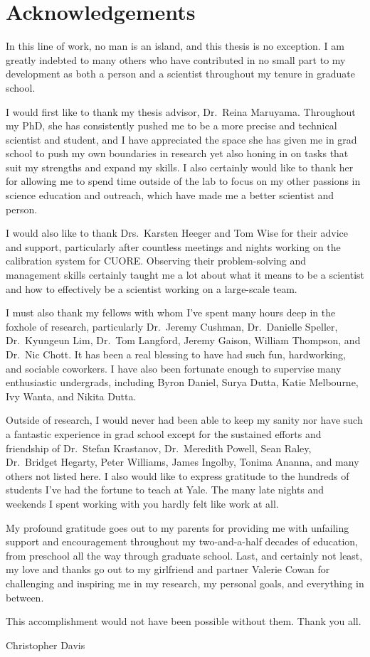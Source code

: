 \chapter*{Acknowledgements}
In this line of work, no man is an island, and this thesis is no exception.
I am greatly indebted to many others who have contributed in no small part to my development as both a person and a scientist throughout my tenure in graduate school.

I would first like to thank my thesis advisor, Dr.\ Reina Maruyama.
Throughout my PhD, she has consistently pushed me to be a more precise and technical scientist and student, and I have appreciated the space she has given me in grad school to push my own boundaries in research yet also honing in on tasks that suit my strengths and expand my skills.
I also certainly would like to thank her for allowing me to spend time outside of the lab to focus on my other passions in science education and outreach, which have made me a better scientist and person.

I would also like to thank Drs.\ Karsten Heeger and Tom Wise for their advice and support, particularly after countless meetings and nights working on the calibration system for CUORE.
Observing their problem-solving and management skills certainly taught me a lot about what it means to be a scientist and how to effectively be a scientist working on a large-scale team.

I must also thank my fellows with whom I've spent many hours deep in the foxhole of research, particularly Dr.\ Jeremy Cushman, Dr.\ Danielle Speller, Dr.\ Kyungeun Lim, Dr.\ Tom Langford, Jeremy Gaison, William Thompson, and Dr.\ Nic Chott. It has been a real blessing to have had such fun, hardworking, and sociable coworkers.
I have also been fortunate enough to supervise many enthusiastic undergrads, including Byron Daniel, Surya Dutta, Katie Melbourne, Ivy Wanta, and Nikita Dutta.

Outside of research, I would never had been able to keep my sanity nor have such a fantastic experience in grad school except for the sustained efforts and friendship of Dr.\ Stefan Krastanov, Dr.\ Meredith Powell, Sean Raley, Dr.\ Bridget Hegarty, Peter Williams, James Ingolby, Tonima Ananna, and many others not listed here.
I also would like to express gratitude to the hundreds of students I've had the fortune to teach at Yale.
The many late nights and weekends I spent working with you hardly felt like work at all.

My profound gratitude goes out to my parents for providing me with unfailing support and encouragement throughout my two-and-a-half decades of education, from preschool all the way through graduate school.
Last, and certainly not least, my love and thanks go out to my girlfriend and partner Valerie Cowan for challenging and inspiring me in my research, my personal goals, and everything in between.

\hfill

This accomplishment would not have been possible without them. Thank you all.

\RaggedRight Christopher Davis
